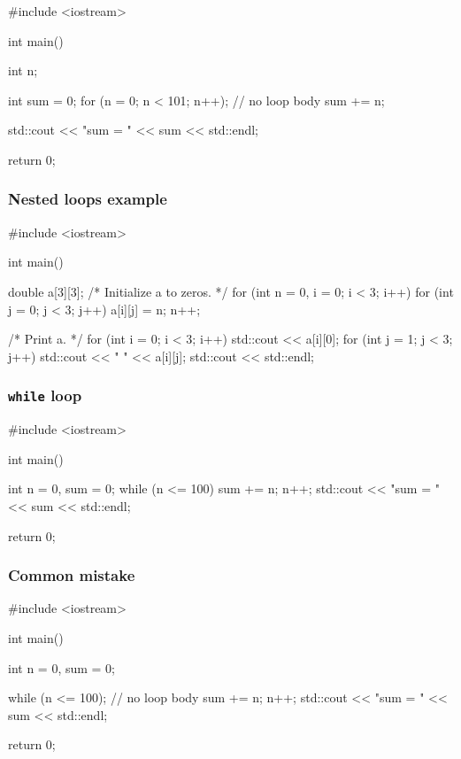 \documentclass[12pt,letterpaper,twoside]{article}
\begin{document}
\begin{cpp}
#include <iostream>

int main() {
  int n;

  int sum = 0;
  for (n = 0; n < 101; n++); // no loop body
  {
    sum += n;
  }

  std::cout << "sum = " << sum << std::endl;

  return 0;
}
\end{cpp}

\subsubsection{Nested loops example}
\begin{cpp}

#include <iostream>

int main() {
  double a[3][3];
  /* Initialize a to zeros. */
  for (int n = 0, i = 0; i < 3; i++) {
    for (int j = 0; j < 3; j++) {
      a[i][j] = n;
      n++;
    }
  }

  /* Print a. */
  for (int i = 0; i < 3; i++) {
    std::cout << a[i][0];
    for (int j = 1; j < 3; j++)
      std::cout << " " << a[i][j];
    std::cout << std::endl;
  }
}
\end{cpp}

\subsubsection{\texorpdfstring{\texttt{while} loop}{while loop}}
\begin{cpp}

#include <iostream>

int main() {
  int n = 0, sum = 0;
  while (n <= 100) {
    sum += n;
    n++;
  }
  std::cout << "sum = " << sum << std::endl;

  return 0;
}
\end{cpp}

\subsubsection{Common mistake}
\begin{cpp}
#include <iostream>

int main() {
  int n = 0, sum = 0;

  while (n <= 100); // no loop body
  {
    sum += n;
    n++;
  }
  std::cout << "sum = " << sum << std::endl;

  return 0;
}
\end{cpp}
\end{document}

